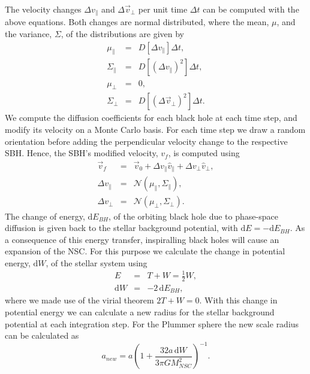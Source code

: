 \documentclass[english, apj]{emulateapj}
\begin{document}
The velocity changes $\Delta v_\parallel$ and $\Delta\vec{v}_\bot$ per unit time $\Delta t$ can be computed with the above equations. Both changes are normal distributed, where the mean, $\mu$, and the variance, $\Sigma$, of the distributions are given by
\begin{eqnarray}
\mu_\parallel &=& D[\Delta v_\parallel]\Delta t,\\
\Sigma_\parallel &=& D[(\Delta v_\parallel)^2]\Delta t,\\
\mu_\bot &=& 0,\\
\Sigma_\bot &=& D[(\Delta \vec{v}_\bot)^2]\Delta t.
\end{eqnarray}
We compute the diffusion coefficients for each black hole at each time step, and modify its velocity on a Monte Carlo basis. For each time step we draw a random orientation before adding the perpendicular velocity change to the respective SBH. Hence, the SBH's modified velocity, $v_f$, is computed using
\begin{eqnarray}
\vec{v}_f &=& \vec{v}_0 + \Delta v_\parallel \hat{v}_\parallel + \Delta v_\bot \hat{v}_\bot,\\
\Delta v_\parallel &=& \mathcal{N}(\mu_\parallel, \Sigma_\parallel),\\
\Delta v_\bot &=& \mathcal{N}(\mu_\bot, \Sigma_\bot).
\end{eqnarray}
The change of energy, $\mbox{d}E_{BH}$, of the orbiting black hole due to phase-space diffusion is given back to the stellar background potential, with $\mbox{d}E = -\mbox{d}E_{BH}$. As a consequence of this energy transfer, inspiralling black holes will cause an expansion of the NSC. For this purpose we calculate the change in potential energy, $\mbox{d}W$, of the stellar system using
\begin{eqnarray}
E &=& T + W = \frac{1}{2}W,\\
\mbox{d}W &=& -2\,\mbox{d}E_{BH},
\end{eqnarray}
where we made use of the virial theorem $2T+W =0$. With this change in potential energy we can calculate a new radius for the stellar background potential at each integration step. For the Plummer sphere the new scale radius can be calculated as
\begin{equation}
a_{new} = a\left(1+\frac{32a\,\mbox{d}W}{3\pi GM_{NSC}^2}\right)^{-1}.
\end{equation}
\end{document}
